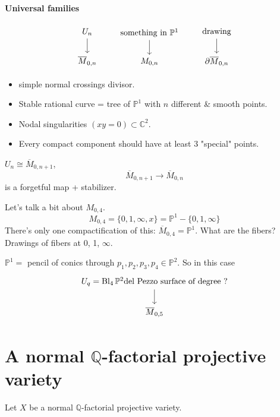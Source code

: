 \paragraph{Universal families} 
\[\begin{tikzcd}
U_{n}\arrow[d]\\
\overline{M}_{0,n}
\end{tikzcd}\qquad \begin{tikzcd}
\text{something in } \mathbb{P}^1\arrow[d]\\
M_{0,n}
\end{tikzcd}\qquad \begin{tikzcd}
\text{drawing} \arrow[d]\\
\partial\overline{M}_{0,n}
\end{tikzcd}\]
 \begin{itemize}
 \item simple normal crossings divisor.
 \item Stable rational curve = tree of $\mathbb{P}^1$ with $n$ different \& smooth points.
\item Nodal singularities $(xy=0)\subset \mathbb{C}^2$.
\item Every compact component should have at least 3 "special" points.
 \end{itemize}

 \begin{lemma}
 	$U_n\cong \overline{M}_{0,n+1}$,
	\[\overline{M}_{0,n+1}\longrightarrow \overline{M}_{0,n}\]
	is a forgetful map + stabilizer.
 \end{lemma}
Let's talk a bit about $M_{0,4}$.
 \[M_{0,4}=\{0,1,\infty,x\} =\mathbb{P}^1-\{0,1,\infty\}\]
 There's only one compactification of this: $\overline{M}_{0,4}=\mathbb{P}^1$. What are the fibers? Drawings of fibers at 0, 1, $\infty$.

 $\mathbb{P}^ 1=$ pencil of conics through $p_1,p_2,p_3,p_4\in\mathbb{P}^2$. So in this case
 \[\begin{tikzcd}
 U_q=\operatorname{Bl}_{4}\mathbb{P}^2\text{del Pezzo surface of degree ?} \arrow[d]\\
 \overline{M}_{0,5}
 \end{tikzcd}\]

\section{A normal $\mathbb{Q}$-factorial projective variety}

Let $X$ be a normal $\mathbb{Q}$-factorial projective variety.


